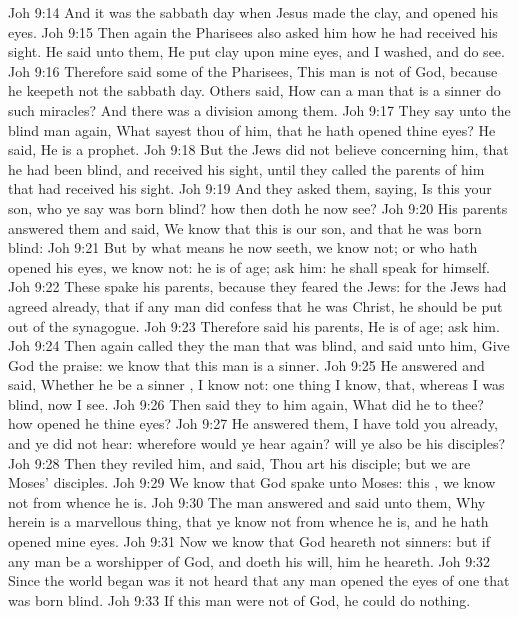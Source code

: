 \vs Joh 9:14 And it was the sabbath day when Jesus made the clay, and opened his eyes.
\vs Joh 9:15 Then again the Pharisees also asked him how he had received his sight. He said unto them, He put clay upon mine eyes, and I washed, and do see.
\vs Joh 9:16 Therefore said some of the Pharisees, This man is not of God, because he keepeth not the sabbath day. Others said, How can a man that is a sinner do such miracles? And there was a division among them.
\vs Joh 9:17 They say unto the blind man again, What sayest thou of him, that he hath opened thine eyes? He said, He is a prophet.
\vs Joh 9:18 But the Jews did not believe concerning him, that he had been blind, and received his sight, until they called the parents of him that had received his sight.
\vs Joh 9:19 And they asked them, saying, Is this your son, who ye say was born blind? how then doth he now see?
\vs Joh 9:20 His parents answered them and said, We know that this is our son, and that he was born blind:
\vs Joh 9:21 But by what means he now seeth, we know not; or who hath opened his eyes, we know not: he is of age; ask him: he shall speak for himself.
\vs Joh 9:22 These  spake his parents, because they feared the Jews: for the Jews had agreed already, that if any man did confess that he was Christ, he should be put out of the synagogue.
\vs Joh 9:23 Therefore said his parents, He is of age; ask him.
\vs Joh 9:24 Then again called they the man that was blind, and said unto him, Give God the praise: we know that this man is a sinner.
\vs Joh 9:25 He answered and said, Whether he be a sinner , I know not: one thing I know, that, whereas I was blind, now I see.
\vs Joh 9:26 Then said they to him again, What did he to thee? how opened he thine eyes?
\vs Joh 9:27 He answered them, I have told you already, and ye did not hear: wherefore would ye hear  again? will ye also be his disciples?
\vs Joh 9:28 Then they reviled him, and said, Thou art his disciple; but we are Moses' disciples.
\vs Joh 9:29 We know that God spake unto Moses:  this , we know not from whence he is.
\vs Joh 9:30 The man answered and said unto them, Why herein is a marvellous thing, that ye know not from whence he is, and  he hath opened mine eyes.
\vs Joh 9:31 Now we know that God heareth not sinners: but if any man be a worshipper of God, and doeth his will, him he heareth.
\vs Joh 9:32 Since the world began was it not heard that any man opened the eyes of one that was born blind.
\vs Joh 9:33 If this man were not of God, he could do nothing.
